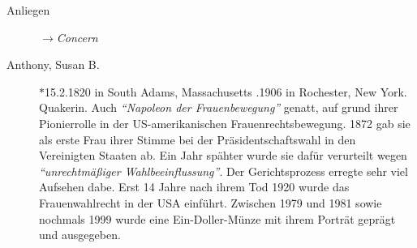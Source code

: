\begin{description}
 \item[Anliegen] $\to$\textit{Concern}

 \item[Anthony, Susan B.] $\ast$15.2.1820 in South Adams, Massachusetts
.1906 in Rochester, New York. Quakerin. Auch \textit{"`Napoleon der
Frauenbewegung"'} genatt, auf grund ihrer Pionierrolle in der US-amerikanischen
Frauenrechtsbewegung. 1872 gab sie als erste Frau ihrer Stimme bei der
Präsidentschaftswahl in den Vereinigten Staaten ab. Ein Jahr spähter wurde sie
dafür verurteilt wegen \textit{"`unrechtmäßiger Wahlbeeinflussung"'}. Der
Gerichtsprozess erregte sehr viel Aufsehen dabe. Erst 14 Jahre nach ihrem Tod
1920 wurde das Frauenwahlrecht in der USA einführt. Zwischen 1979 und 1981 sowie
nochmals 1999 wurde eine Ein-Doller-Münze mit ihrem Porträt geprägt und
ausgegeben.

 \end{description}
\normalsize
